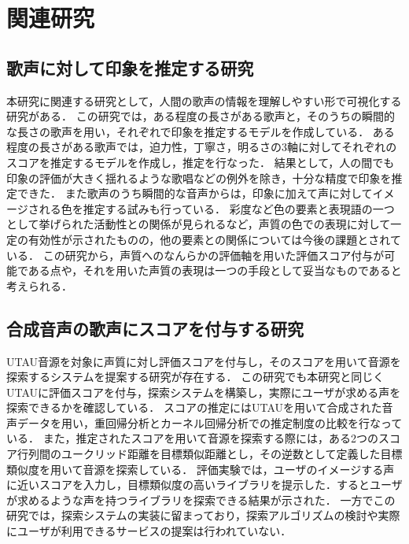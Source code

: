 \thispagestyle{myheadings}
\chapter{関連研究}
\label{sec:format}

\section{歌声に対して印象を推定する研究}
本研究に関連する研究として，人間の歌声の情報を理解しやすい形で可視化する研究\cite{impression}\cite{ama}がある．
この研究では，ある程度の長さがある歌声と，そのうちの瞬間的な長さの歌声を用い，それぞれで印象を推定するモデルを作成している．
ある程度の長さがある歌声では，迫力性，丁寧さ，明るさの3軸に対してそれぞれのスコアを推定するモデルを作成し，推定を行なった．
結果として，人の間でも印象の評価が大きく揺れるような歌唱などの例外を除き，十分な精度で印象を推定できた．
また歌声のうち瞬間的な音声からは，印象に加えて声に対してイメージされる色を推定する試みも行っている．
彩度など色の要素と表現語の一つとして挙げられた活動性との関係が見られるなど，声質の色での表現に対して一定の有効性が示されたものの，他の要素との関係については今後の課題とされている．
この研究から，声質へのなんらかの評価軸を用いた評価スコア付与が可能である点や，それを用いた声質の表現は一つの手段として妥当なものであると考えられる．

\section{合成音声の歌声にスコアを付与する研究}
UTAU音源を対象に声質に対し評価スコアを付与し，そのスコアを用いて音源を探索するシステムを提案する研究\cite{ong}が存在する．
この研究でも本研究と同じくUTAUに評価スコアを付与，探索システムを構築し，実際にユーザが求める声を探索できるかを確認している．
スコアの推定にはUTAUを用いて合成された音声データを用い，重回帰分析とカーネル回帰分析での推定制度の比較を行なっている．
また，推定されたスコアを用いて音源を探索する際には，ある2つのスコア行列間のユークリッド距離を目標類似距離とし，その逆数として定義した目標類似度を用いて音源を探索している．
評価実験では，ユーザのイメージする声に近いスコアを入力し，目標類似度の高いライブラリを提示した．するとユーザが求めるような声を持つライブラリを探索できる結果が示された．
一方でこの研究では，探索システムの実装に留まっており，探索アルゴリズムの検討や実際にユーザが利用できるサービスの提案は行われていない．

